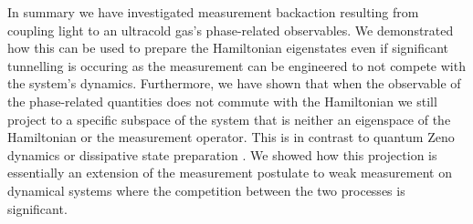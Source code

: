 In summary we have investigated measurement backaction resulting from
coupling light to an ultracold gas's phase-related observables. We
demonstrated how this can be used to prepare the Hamiltonian
eigenstates even if significant tunnelling is occuring as the
measurement can be engineered to not compete with the system's
dynamics. Furthermore, we have shown that when the observable of the
phase-related quantities does not commute with the Hamiltonian we
still project to a specific subspace of the system that is neither an
eigenspace of the Hamiltonian or the measurement operator. This is in
contrast to quantum Zeno dynamics \cite{misra1977, facchi2008,
  raimond2010, raimond2012, signoles2014} or dissipative state
preparation \cite{diehl2008}. We showed how this projection is
essentially an extension of the measurement postulate to weak
measurement on dynamical systems where the competition between the two
processes is significant.
